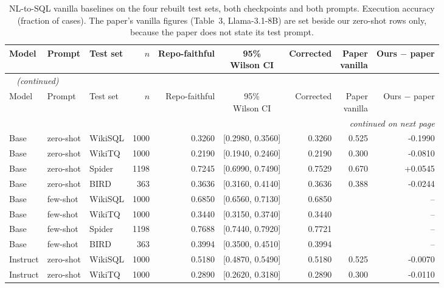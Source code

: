 {\footnotesize
{}
\setlength{\tabcolsep}{4.2pt}
\begin{longtable}{@{}lllrrcrrr@{}}
\caption{NL-to-SQL vanilla baselines on the four rebuilt test sets, both checkpoints and both prompts. Execution accuracy (fraction of cases). The paper's vanilla figures (Table~3, Llama-3.1-8B) are set beside our zero-shot rows only, because the paper does not state its test prompt.}\label{tab:gen-vanilla-sql}\\
\toprule
\rowcolor{headshade}Model & Prompt & Test set & $n$ & Repo-faithful & \makecell{95\%\\Wilson CI} & Corrected & \makecell{Paper\\vanilla} & Ours $-$ paper\\
\midrule
\endfirsthead
\multicolumn{9}{l}{\textit{\tablename~\thetable{} (continued)}}\\
\toprule
\rowcolor{headshade}Model & Prompt & Test set & $n$ & Repo-faithful & \makecell{95\%\\Wilson CI} & Corrected & \makecell{Paper\\vanilla} & Ours $-$ paper\\
\midrule
\endhead
\midrule
\multicolumn{9}{r}{\textit{continued on next page}}\\
\endfoot
\bottomrule
\endlastfoot
Base & zero-shot & WikiSQL & 1000 & 0.3260 & [0.2980, 0.3560] & 0.3260 & 0.525 & -0.1990\\
Base & zero-shot & WikiTQ & 1000 & 0.2190 & [0.1940, 0.2460] & 0.2190 & 0.300 & -0.0810\\
Base & zero-shot & Spider & 1198 & 0.7245 & [0.6990, 0.7490] & 0.7529 & 0.670 & +0.0545\\
Base & zero-shot & BIRD & 363 & 0.3636 & [0.3160, 0.4140] & 0.3636 & 0.388 & -0.0244\\
Base & few-shot & WikiSQL & 1000 & 0.6850 & [0.6560, 0.7130] & 0.6850 &  & --\\
Base & few-shot & WikiTQ & 1000 & 0.3440 & [0.3150, 0.3740] & 0.3440 &  & --\\
Base & few-shot & Spider & 1198 & 0.7688 & [0.7440, 0.7920] & 0.7721 &  & --\\
Base & few-shot & BIRD & 363 & 0.3994 & [0.3500, 0.4510] & 0.3994 &  & --\\
Instruct & zero-shot & WikiSQL & 1000 & 0.5180 & [0.4870, 0.5490] & 0.5180 & 0.525 & -0.0070\\
Instruct & zero-shot & WikiTQ & 1000 & 0.2890 & [0.2620, 0.3180] & 0.2890 & 0.300 & -0.0110\\

\end{longtable}}
